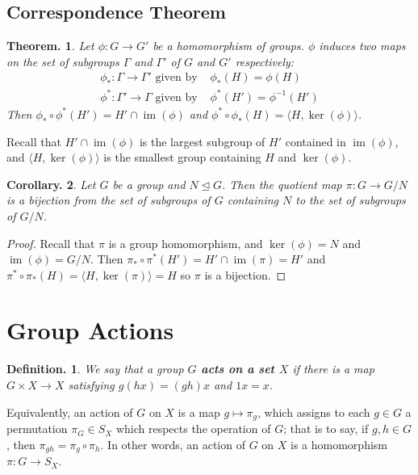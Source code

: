 \documentclass[11pt, a4paper]{memoir}
\newcommand{\mbf}[1]{{\boldmath\bfseries #1}}
\theoremstyle{change}
\newtheorem{theorem}{Theorem.}[section]
\newtheorem{corollary}[theorem]{Corollary.}
\theoremstyle{plain}
\theoremstyle{nonumberplain}
\newtheorem{definition}{Definition.}
\newtheorem{proof}{Proof}
\DeclareMathOperator{\im}{im}
\numberwithin{equation}{section}
\begin{document}
\subsection{Correspondence Theorem}
\begin{theorem}
    Let $\phi:G\to G'$ be a homomorphism of groups.
    $\phi$ induces two maps on the set of subgroups $\Gamma$ and $\Gamma'$ of $G$ and $G'$ respectively:
    \begin{align*}
        \phi_*:\Gamma\to\Gamma'\text{ given by }&\phi_*(H)=\phi(H)\\
        \phi^*:\Gamma'\to\Gamma\text{ given by }&\phi^*(H')=\phi^{-1}(H')
    \end{align*}
    Then $\phi_*\circ\phi^*(H')=H'\cap\im(\phi)$ and $\phi^*\circ\phi_*(H)=\langle H,\ker(\phi)\rangle$.
\end{theorem}
Recall that $H'\cap\im(\phi)$ is the largest subgroup of $H'$ contained in $\im(\phi)$, and $\langle H,\ker(\phi)\rangle$ is the smallest group containing $H$ and $\ker(\phi)$.
\begin{corollary}
    Let $G$ be a group and $N\trianglelefteq G$.
    Then the quotient map $\pi:G\to G/N$ is a bijection from the set of subgroups of $G$ containing $N$ to the set of subgroups of $G/N$.
\end{corollary}
\begin{proof}
    Recall that $\pi$ is a group homomorphism, and $\ker(\phi)=N$ and $\im(\phi)=G/N$.
    Then $\pi_*\circ\pi^*(H')=H'\cap\im(\pi)=H'$ and $\pi^*\circ\pi_*(H)=\langle H,\ker(\pi)\rangle=H$ so $\pi$ is a bijection.
\end{proof}
\section{Group Actions}
\begin{definition}
    We say that a group \mbf{$G$ acts on a set $X$} if there is a map $G\times X\to X$ satisfying $g(hx)=(gh)x$ and $1x=x$.
\end{definition}
Equivalently, an action of $G$ on $X$ is a map $g\mapsto\pi_g$, which assigns to each $g\in G$ a permutation $\pi_G\in S_X$ which respects the operation of $G$; that is to say, if $g,h\in G$, then $\pi_{gh}=\pi_g\circ\pi_h$.
In other words, an action of $G$ on $X$ is a homomorphism $\pi:G\to S_X$.
\end{document}
